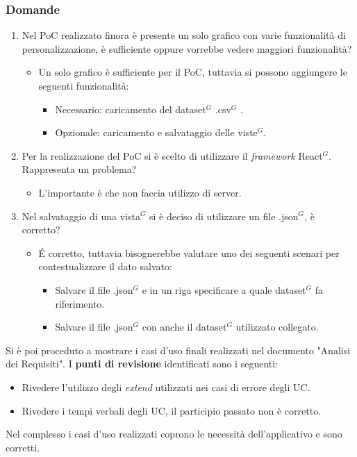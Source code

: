 \subsubsection{Domande}
\begin{enumerate}
	\item Nel PoC realizzato finora è presente un solo grafico con varie funzionalità di personalizzazione, è sufficiente oppure vorrebbe vedere maggiori funzionalità?
	\begin{itemize}
		\item Un solo grafico è sufficiente per il PoC, tuttavia si possono aggiungere le seguenti funzionalità:
		\begin{itemize}
			\item Necessario: caricamento del dataset$^{G}$ .csv$^{G}$ .
			\item Opzionale: caricamento e salvataggio delle viste$^{G}$.
		\end{itemize}
	\end{itemize}
	\item Per la realizzazione del PoC si è scelto di utilizzare il \textit{framework} React$^{G}$. Rappresenta un problema?
	\begin{itemize}
		\item L'importante è che non faccia utilizzo di server.
	\end{itemize}
	\item Nel salvataggio di una vista$^{G}$ si è deciso di utilizzare un file .json$^{G}$, è corretto?
	\begin{itemize}
		\item \' E corretto, tuttavia bisognerebbe valutare uno dei seguenti scenari per contestualizzare il dato salvato:
		\begin{itemize}
			\item Salvare il file .json$^{G}$ e in un riga specificare a quale dataset$^{G}$ fa riferimento.
			\item Salvare il file .json$^{G}$ con anche il dataset$^{G}$ utilizzato collegato.
		\end{itemize}
	\end{itemize}
\end{enumerate}

\noindent
Si è poi proceduto a mostrare i casi d'uso finali realizzati nel documento "Analisi dei Requisiti".
I \textbf{punti di revisione} identificati sono i seguenti:
\begin{itemize}
	\item Rivedere l'utilizzo degli \textit{extend} utilizzati nei casi di errore degli UC.
	\item Rivedere i tempi verbali degli UC, il participio passato non è corretto.
\end{itemize}
Nel complesso i casi d'uso realizzati coprono le necessità dell'applicativo e sono corretti.

